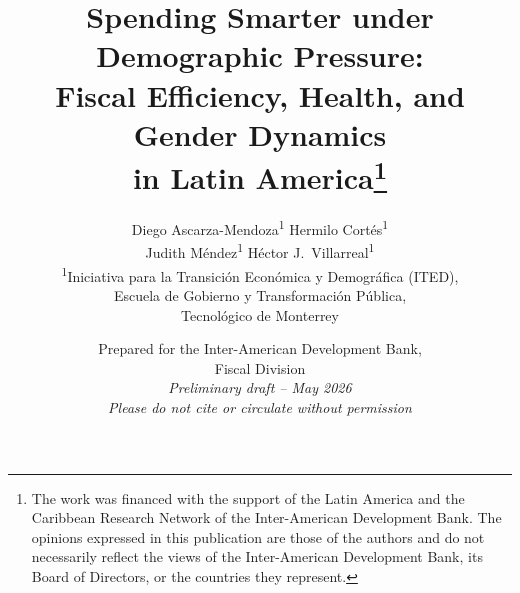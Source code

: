 \documentclass[12pt,a4paper]{article}
\begin{document}
\title{\textbf{Spending Smarter under Demographic Pressure:}\\[6pt]
Fiscal Efficiency, Health, and Gender Dynamics\\
in Latin America\thanks{The work was financed with the support of the Latin America and the Caribbean Research Network of the Inter-American Development Bank. The opinions expressed in this publication are those of the authors and do not necessarily reflect the views of the Inter-American Development Bank, its Board of Directors, or the countries they represent.}}

\author{
Diego Ascarza-Mendoza\textsuperscript{1} \quad Hermilo Cort\'es\textsuperscript{1}\\[3pt]
Judith M\'endez\textsuperscript{1} \quad H\'ector J.\ Villarreal\textsuperscript{1}
\\[6pt]
\textsuperscript{1}Iniciativa para la Transici\'on Econ\'omica y Demogr\'afica (ITED),\\
Escuela de Gobierno y Transformaci\'on P\'ublica,\\
Tecnol\'ogico de Monterrey
}

\date{%
Prepared for the Inter-American Development Bank,\\
Fiscal Division\\[12pt]
\textit{Preliminary draft -- May 2026}\\
\textit{Please do not cite or circulate without permission}
}

\maketitle
\end{document}
